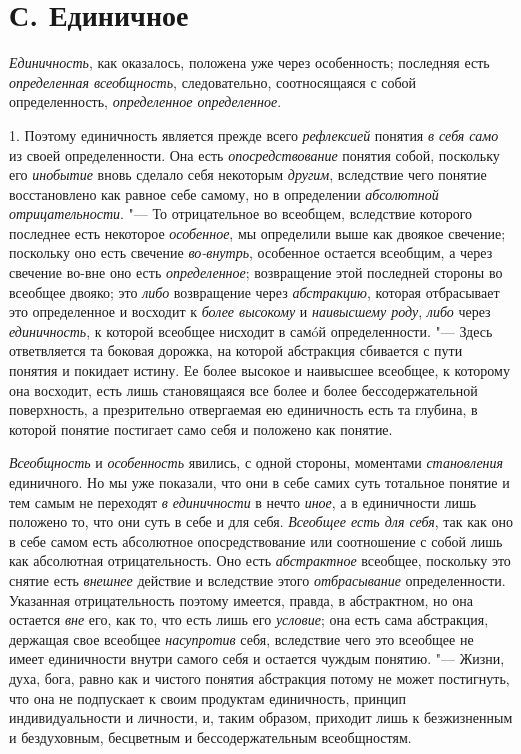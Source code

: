 {\section[С. Единичное]{С. Единичное}
{\em Единичность}, как
оказалось, положена уже через особенность; последняя есть
{\em определенная всеобщность},
следовательно, соотносящаяся с собой определенность,
{\em определенное определенное}.

1. Поэтому единичность является прежде всего
{\em рефлексией} понятия
{\em в себя само }из
своей определенности. Она есть
{\em опосредствование}
понятия собой, поскольку его
{\em инобытие} вновь
сделало себя некоторым {\em другим},
вследствие чего понятие восстановлено как равное себе самому,
но в определении {\em абсолютной
отрицательности}. "--- То отрицательное во всеобщем, вследствие
которого последнее есть некоторое
{\em особенное}, мы
определили
выше
как двоякое свечение; поскольку оно есть свечение
{\em во-внутрь},
особенное остается всеобщим, а через свечение во-вне оно есть
{\em определенное};
возвращение этой последней стороны во всеобщее двояко; это
{\em либо} возвращение
через {\em абстракцию},
которая отбрасывает это определенное и восходит к
{\em более высокому} и
{\em наивысшему роду},
{\em либо} через
{\em единичность}, к
которой всеобщее нисходит в самóй определенности. "--- Здесь
ответвляется та боковая дорожка, на которой абстракция сбивается с пути
понятия и покидает истину. Ее более высокое и наивысшее всеобщее, к
которому она восходит, есть лишь становящаяся все более и более
бессодержательной поверхность, а презрительно отвергаемая ею единичность
есть та глубина, в которой понятие постигает само себя и положено как
понятие.

{\em Всеобщность} и
{\em особенность}
явились, с одной стороны, моментами
{\em становления}
единичного. Но мы уже показали, что они в себе самих суть
тотальное понятие и тем самым не переходят
{\em в единичности} в
нечто {\em иное}, а в
единичности лишь положено то, что они суть в себе и для себя.
{\em Всеобщее есть для себя},
так как оно в себе самом есть абсолютное опосредствование или
соотношение с собой лишь как абсолютная отрицательность. Оно есть
{\em абстрактное}
всеобщее, поскольку это снятие есть
{\em внешнее} действие и
вследствие этого {\em отбрасывание}
определенности. Указанная отрицательность поэтому имеется,
правда, в абстрактном, но она остается
{\em вне} его, как то,
что есть лишь его {\em условие};
она есть сама абстракция, держащая свое всеобщее
{\em насупротив} себя,
вследствие чего это всеобщее не имеет единичности внутри самого себя и
остается чуждым понятию. "--- Жизни, духа, бога, равно как и
чистого понятия абстракция потому не может постигнуть, что она не
подпускает к своим продуктам единичность, принцип индивидуальности и
личности, и, таким образом, приходит лишь к безжизненным и бездуховным,
бесцветным и бессодержательным всеобщностям.

}
